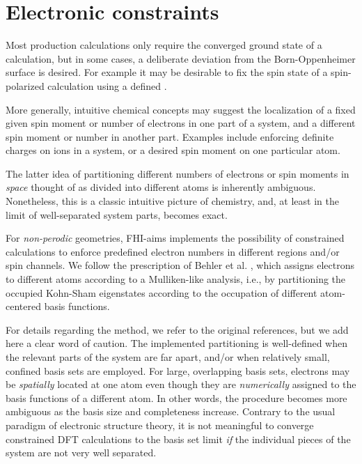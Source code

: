 \section{Electronic constraints}
\label{Sec:constraint}

Most production calculations only require the converged ground state
of a calculation, but in some cases, a deliberate deviation from the
Born-Oppenheimer surface is desired. For example it may be desirable
to fix the spin state of a spin-polarized calculation using a defined
. 

More generally, intuitive chemical concepts
may suggest the localization of a fixed given spin moment or number of
electrons in one part of a system, and a different spin moment or
number in another part. Examples include enforcing definite charges on 
ions in a system, or a desired spin moment on one particular atom.

The latter idea of partitioning different numbers of electrons or spin
moments in \emph{space} thought of as divided into different atoms is
inherently ambiguous. Nonetheless, this is a classic intuitive picture
of chemistry, and, at least in the limit of well-separated system
parts, becomes exact.

For \emph{non-perodic} geometries, FHI-aims implements the possibility
of constrained calculations to enforce predefined electron numbers in
different regions and/or spin channels. We follow the prescription of
Behler et al. \cite{Behler05,Behler07}, which assigns electrons to different
atoms according to a Mulliken-like analysis, i.e., by partitioning the
occupied Kohn-Sham eigenstates according to the occupation of
different atom-centered basis functions. 

For details regarding the method, we refer to the original references,
but we add here a clear word of caution. The implemented partitioning
is well-defined when the relevant parts of the system are far apart,
and/or when relatively small, confined basis sets are employed. For
large, overlapping basis sets, electrons may be \emph{spatially}
located at one atom even though they are \emph{numerically} assigned
to the basis functions of a different atom. In other words, the
procedure becomes more ambiguous as the basis size and completeness
increase. Contrary to the usual paradigm of electronic structure
theory, it is not meaningful to converge constrained DFT calculations
to the basis set limit \emph{if} the individual pieces of the system
are not very well separated.

